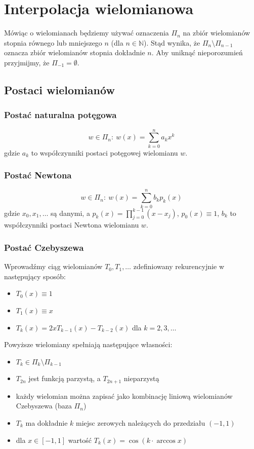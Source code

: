 \documentclass[a4paper,11pt]{article}
\begin{document}
\clearpage
\section{Interpolacja wielomianowa}
Mówiąc o wielomianach będziemy używać oznaczenia $\Pi_n$ na zbiór wielomianów stopnia równego lub mniejszego $n$ (dla $n\in\mathbb{N}$). Stąd wynika, że $\Pi_n \setminus \Pi_{n-1}$ oznacza zbiór wielomianów stopnia dokładnie $n$. Aby uniknąć nieporozumień przyjmijmy, że $\Pi_{-1}=\emptyset$.

\subsection{Postaci wielomianów}
\subsubsection{Postać naturalna potęgowa} 
$$w\in\Pi_n:\ w(x)=\sum\limits_{k=0}^{n} a_{k}x^{k}$$
gdzie $a_k$ to współczynniki postaci potęgowej wielomianu $w$.

\subsubsection{Postać Newtona} 
$$w\in\Pi_n:\ w(x)=\sum\limits_{k=0}^{n} b_{k}p_{k}(x)$$
gdzie $x_0, x_1, \ldots$ są danymi, a $p_k(x)=\prod\limits_{j=0}^{k-1}(x-x_j)$, $p_0(x)\equiv 1$, $b_k$ to współczynniki postaci Newtona wielomianu $w$.

\subsubsection{Postać Czebyszewa}
Wprowadźmy ciąg wielomianów $T_0, T_1, \ldots$ zdefiniowany rekurencyjnie w następujący sposób:
	\begin{itemize}
	\item $T_0(x) \equiv 1$
	\item $T_1(x) \equiv x$
	\item $T_k(x) = 2xT_{k-1}(x)-T_{k-2}(x)$ dla $k=2,3,\ldots$
	\end{itemize}

\noindent Powyższe wielomiany spełniają następujące własności:
\begin{itemize}
\item $T_k \in \Pi_k \setminus \Pi_{k-1}$
\item $T_{2n}$ jest funkcją parzystą, a $T_{2n+1}$ nieparzystą
\item każdy wielomian można zapisać jako kombinację liniową wielomianów Czebyszewa (baza $\Pi_n$)
\item $T_k$ ma dokładnie $k$ miejsc zerowych należących do przedziału $(-1,1)$
\item dla $x\in[-1,1]$ wartość $T_k(x)=\cos(k\cdot\arccos x)$
\end{itemize}
\end{document}
